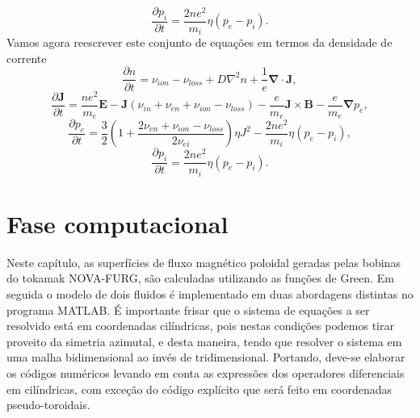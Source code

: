 \documentclass[12pt,oneside,a4paper]{abntex2}
\begin{document}
\begin{equation}
\frac{\partial p_i}{\partial t} = \frac{2ne^2}{m_i}\eta(p_e-p_i) .
\end{equation}
Vamos agora reescrever este conjunto de equações em termos da densidade de corrente
\begin{equation}
\frac{\partial n}{\partial t} = \nu_{ion} - \nu_{loss}+D\nabla^2n + \frac{1}{e} \bm{\nabla} \cdot \bm{J},
\end{equation}
\begin{equation}
\frac{\partial \bm{J}}{\partial t} =  \frac{ne^2}{m_e} \bm{E} -\bm{J}(\nu_{in}+\nu_{en}+\nu_{ion}-\nu_{loss}) -\frac{e}{m_e}\bm{J} \times \bm{B}-\frac{e}{m_e}\bm{\nabla} p_e ,
\end{equation}
\begin{equation}
\frac{\partial p_e}{\partial t} = \frac{3}{2} \left(1+\frac{2 \nu_{en} + \nu_{ion} - \nu_{loss}}{2\nu_{ei}}\right)\eta J^2  -\frac{2ne^2}{m_i} \eta (p_e-p_i),
\end{equation}
\begin{equation}
\frac{\partial p_i}{\partial t} = \frac{2ne^2}{m_i}\eta(p_e-p_i) .
\end{equation}

\chapter{Fase computacional}
\noindent Neste capítulo, as superfícies de fluxo magnético poloidal geradas pelas bobinas do tokamak NOVA-FURG, são calculadas utilizando as funções de Green. 
Em seguida o modelo de dois fluidos é implementado em duas abordagens distintas no programa MATLAB. 
É importante frisar que o sistema de equações a ser resolvido está em coordenadas cilíndricas, pois nestas condições podemos tirar proveito da simetria azimutal, e desta maneira, tendo que resolver o sistema em uma malha bidimensional ao invés de tridimensional. 
Portando, deve-se elaborar os códigos numéricos levando em conta as expressões dos operadores diferenciais em cilíndricas, com exceção do código explícito que será feito em coordenadas pseudo-toroidais. 
\end{document}
